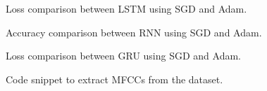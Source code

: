     \begin{figure}[h]
      \centering
      \qquad
      \caption{Loss comparison between LSTM using SGD and Adam.}%
      \label{lstml}
    \end{figure}
    \begin{figure}[h]
      \centering
      \qquad
      \caption{Accuracy comparison between RNN using SGD and Adam.}%
      \label{grua}
    \end{figure}
    \begin{figure}[h]
      \centering
      \qquad
      \caption{Loss comparison between GRU using SGD and Adam.}%
      \label{grul}
    \end{figure}

\begin{figure}[h]
  \centering
  
  \caption{Code snippet to extract MFCCs from the dataset.}
  \label{mfccsnip}
\end{figure}
